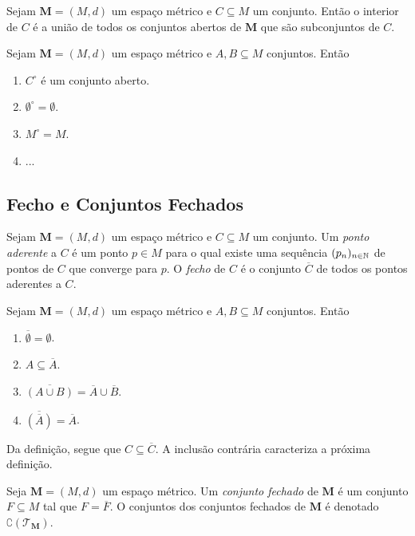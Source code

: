 \begin{prop}
	Sejam $\bm M = (M,d)$ um espaço métrico e $C \subseteq M$ um conjunto. Então o interior de $C$ é a união de todos os conjuntos abertos de $\bm M$ que são subconjuntos de $C$.
\end{prop}

\begin{prop}
	Sejam $\bm M = (M,d)$ um espaço métrico e $A,B \subseteq M$ conjuntos. Então
	\begin{enumerate}
	\item $C^\circ$ é um conjunto aberto.
	\item $\emptyset^\circ = \emptyset$.
	\item $M^\circ = M$.
	\item ...
	\end{enumerate}
\end{prop}

\subsection{Fecho e Conjuntos Fechados}

\begin{defi}
	Sejam $\bm M = (M,d)$ um espaço métrico e $C \subseteq M$ um conjunto. Um \emph{ponto aderente} a $C$ é um ponto $p \in M$ para o qual existe uma sequência $(p_n)_{n \in \mathbb{N}}$ de pontos de $C$ que converge para $p$. O \emph{fecho} de $C$ é o conjunto $\overline C$ de todos os pontos aderentes a $C$.
\end{defi}

\begin{prop}
	Sejam $\bm M = (M,d)$ um espaço métrico e $A,B \subseteq M$ conjuntos. Então
	\begin{enumerate}
	\item $\overline \emptyset = \emptyset$.
	\item $A \subseteq \overline A$.
	\item $\overline{(A \cup B)} = \overline A \cup \overline B$.
	\item $\overline{(\overline A)} = \overline A$.
	\end{enumerate}
\end{prop}

Da definição, segue que $C \subseteq \overline C$. A inclusão contrária caracteriza a próxima definição.

\begin{defi}
	Seja $\bm M = (M,d)$ um espaço métrico. Um \emph{conjunto fechado} de $\bm M$ é um conjunto $F \subseteq M$ tal que $F = \overline F$. O conjuntos dos conjuntos fechados de $\bm M$ é denotado $\complement( \mathcal T_{\bm M})$.
\end{defi}

